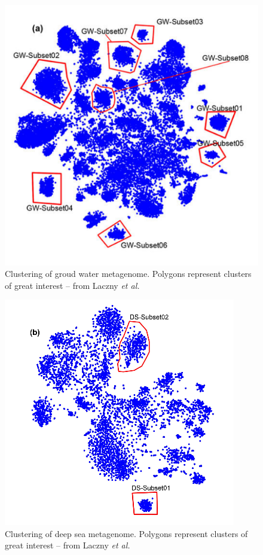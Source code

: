 \documentclass[twocolumn]{bmcart}%
\begin{document}
	\begin{figure}[h!]
		\includegraphics[width=.9\linewidth]{bilder/groudwaterCluster.png}
		\caption{Clustering of groud water metagenome. Polygons represent clusters of great interest -- from Laczny \textit{et al.}\cite{Laczny2014}}
		\label{img:groudwater}
	\end{figure}%
\begin{figure}[h!]
		\centering
	\includegraphics[width=.9\linewidth]{bilder/marineCluster.png}
	\caption{Clustering of deep sea metagenome. Polygons represent clusters of great interest -- from Laczny \textit{et al.}\cite{Laczny2014}}
	\label{img:deepsea}
\end{figure}%
\end{document}
